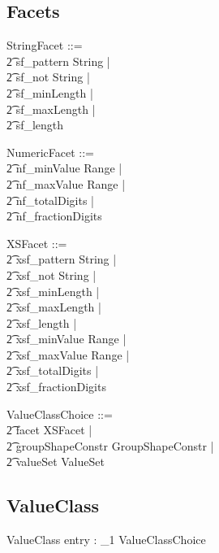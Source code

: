 \documentclass{article}
\begin{document}
\subsection{Facets}
\begin{zed}
StringFacet ::=  \\
\t2 sf\_pattern \ldata String \rdata | \\
\t2 sf\_not \ldata String \rdata  | \\
\t2 sf\_minLength \ldata \nat \rdata  | \\
\t2 sf\_maxLength \ldata \nat \rdata |  \\
\t2 sf\_length \ldata \nat \rdata  
\end{zed}

\begin{zed}
NumericFacet ::= \\
\t2 nf\_minValue \ldata Range \rdata  | \\
\t2 nf\_maxValue \ldata Range \rdata  | \\
\t2 nf\_totalDigits \ldata \nat \rdata |  \\
\t2 nf\_fractionDigits \ldata \nat \rdata
\end{zed}

\begin{zed}
XSFacet ::=  \\
\t2 xsf\_pattern \ldata String \rdata | \\
\t2 xsf\_not \ldata String \rdata  | \\
\t2 xsf\_minLength \ldata \nat \rdata  | \\
\t2 xsf\_maxLength \ldata \nat \rdata |  \\
\t2 xsf\_length \ldata \nat \rdata  | \\
\t2 xsf\_minValue \ldata Range \rdata  | \\
\t2 xsf\_maxValue \ldata Range \rdata  | \\
\t2 xsf\_totalDigits \ldata \nat \rdata |  \\
\t2 xsf\_fractionDigits \ldata \nat \rdata
\end{zed}

\begin{zed}
ValueClassChoice ::= \\
\t2 facet \ldata XSFacet \rdata | \\
\t2 groupShapeConstr \ldata GroupShapeConstr \rdata | \\
\t2 valueSet \ldata ValueSet \rdata
\end{zed}

\subsection{ValueClass}
\begin{schema}{ValueClass}
	entry : \power_1 ValueClassChoice
\end{schema}
\end{document}
